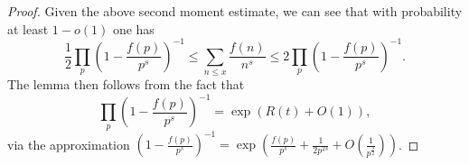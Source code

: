 \documentclass[10pt,a4paper]{amsart}
\begin{document}
\begin{proof}
  Given the above second moment estimate, we can see that with probability at least $1 - o(1)$ one has
    $$\frac{1}{2}\prod_{p} \left( 1 - \frac{f(p)}{p^s} \right)^{-1} \le \sum_{n \le x} \frac{f(n)}{n^s} \le 2\prod_{p} \left( 1 - \frac{f(p)}{p^s} \right)^{-1}.$$
    The lemma then follows from the fact that
    $$\prod_{p} \left( 1 - \frac{f(p)}{p^s} \right)^{-1} = \exp(R(t)+O(1)),$$
via the approximation $\left(1-\frac{f(p)}{p^s}\right)^{-1} = \exp\left(\frac{f(p)}{p^s}+\frac{1}{2p^{2s}}+O\left(\frac{1}{p^\frac{3}{2}}\right)\right)$. 

    

    
\end{proof}
\end{document}
